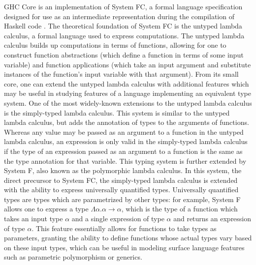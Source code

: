 \documentclass{sig-alternate}
\begin{document}
GHC Core is an implementation of System FC, a formal language specification designed for use as an intermediate representation during the compilation of Haskell code \cite{conf/tldi/SulzmannCJD07}. The theoretical foundation of System FC is the untyped lambda calculus, a formal language used to express computations. The untyped lambda calculus builds up computations in terms of functions, allowing for one to construct function abstractions (which define a function in terms of some input variable) and function applications (which take an input argument and substitute instances of the function's input variable with that argument). From its small core, one can extend the untyped lambda calculus with additional features which may be useful in studying features of a language implementing an equivalent type system. One of the most widely-known extensions to the untyped lambda calculus is the simply-typed lambda calculus. This system is similar to the untyped lambda calculus, but adds the annotation of types to the arguments of functions. Whereas any value may be passed as an argument to a function in the untyped lambda calculus, an expression is only valid in the simply-typed lambda calculus if the type of an expression passed as an argument to a function is the same as the type annotation for that variable. This typing system is further extended by System F, also known as the polymorphic lambda calculus. In this system, the direct precursor to System FC, the simply-typed lambda calculus is extended with the ability to express universally quantified types. Universally quantified types are types which are parametrized by other types: for example, System F allows one to express a type $\Lambda\alpha.\alpha\rightarrow\alpha$, which is the type of a function which takes an input type $\alpha$ and a single expression of type $\alpha$ and returns an expression of type $\alpha$. This feature essentially allows for functions to take types as parameters, granting the ability to define functions whose actual types vary based on these input types, which can be useful in modeling surface language features such as parametric polymorphism or generics. 
\end{document}
